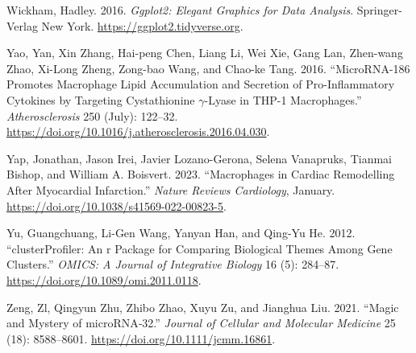 \documentclass[
]{article}
\newlength{\cslhangindent}
\newlength{\cslentryspacingunit} %
\newenvironment{CSLReferences}[2] %
 {%
  \setlength{\parindent}{0pt}
  \ifodd #1
  \let\oldpar\par
  \def\par{\hangindent=\cslhangindent\oldpar}
  \fi
  \setlength{\parskip}{#2\cslentryspacingunit}
 }%
 {}
\begin{document}
\begin{CSLReferences}{1}{0}
\leavevmode{}%
Wickham, Hadley. 2016. \emph{Ggplot2: Elegant Graphics for Data
Analysis}. Springer-Verlag New York.
\url{https://ggplot2.tidyverse.org}.

\leavevmode{}%
Yao, Yan, Xin Zhang, Hai-peng Chen, Liang Li, Wei Xie, Gang Lan,
Zhen-wang Zhao, Xi-Long Zheng, Zong-bao Wang, and Chao-ke Tang. 2016.
{``{MicroRNA}-186 Promotes Macrophage Lipid Accumulation and Secretion
of Pro-Inflammatory Cytokines by Targeting Cystathionine
\(\gamma\)-Lyase in {THP}-1 Macrophages.''} \emph{Atherosclerosis} 250
(July): 122--32.
\url{https://doi.org/10.1016/j.atherosclerosis.2016.04.030}.

\leavevmode{}%
Yap, Jonathan, Jason Irei, Javier Lozano-Gerona, Selena Vanapruks,
Tianmai Bishop, and William A. Boisvert. 2023. {``Macrophages in Cardiac
Remodelling After Myocardial Infarction.''} \emph{Nature Reviews
Cardiology}, January. \url{https://doi.org/10.1038/s41569-022-00823-5}.

\leavevmode{}%
Yu, Guangchuang, Li-Gen Wang, Yanyan Han, and Qing-Yu He. 2012.
{``clusterProfiler: An r Package for Comparing Biological Themes Among
Gene Clusters.''} \emph{OMICS: A Journal of Integrative Biology} 16 (5):
284--87. \url{https://doi.org/10.1089/omi.2011.0118}.

\leavevmode{}%
Zeng, Zl, Qingyun Zhu, Zhibo Zhao, Xuyu Zu, and Jianghua Liu. 2021.
{``Magic and Mystery of {microRNA}‐32.''} \emph{Journal of Cellular and
Molecular Medicine} 25 (18): 8588--8601.
\url{https://doi.org/10.1111/jcmm.16861}.

\end{CSLReferences}
\end{document}
